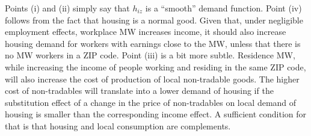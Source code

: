 Points (i) and (ii) simply say that $h_{iz}$ is a ``smooth'' demand function.
Point (iv) follows from the fact that housing is a normal good.
Given that, under negligible employment effects, workplace MW increases income, 
it should also increase housing demand for workers with earnings close to the MW,
unless that there is no MW workers in a ZIP code.
Point (iii) is a bit more subtle.
Residence MW, while increasing the income of people working and residing in the 
same ZIP code, will also increase the cost of production of local non-tradable 
goods.
The higher cost of non-tradables will translate into a lower demand of housing 
if the substitution effect of a change in the price of non-tradables on local demand 
of housing is smaller than the corresponding income effect.
A sufficient condition for that is that housing and local consumption are complements.%

